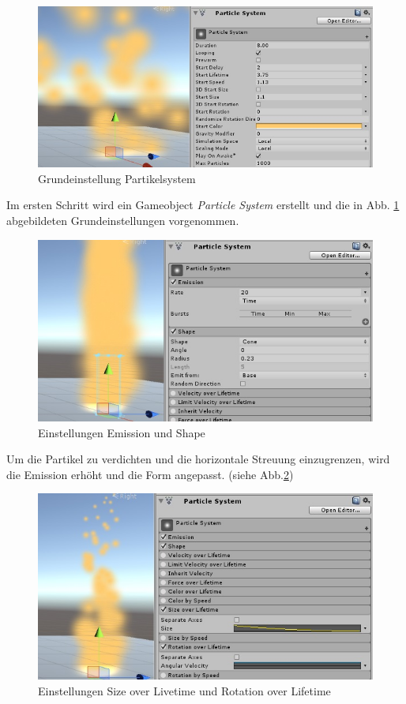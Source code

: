 \begin{figure}[H]
\centering
\includegraphics[width=0.95\linewidth]{Abbildungen/Unity/Fire/fire1}
\caption{Grundeinstellung Partikelsystem}
\label{fig:fire1}
\end{figure}

Im ersten Schritt wird ein Gameobject \textit{Particle System} erstellt und die in Abb. \ref{fig:fire1} abgebildeten Grundeinstellungen vorgenommen.

\begin{figure}[h!]
\centering
\includegraphics[width=0.95\linewidth]{Abbildungen/Unity/Fire/fire2}
\caption{Einstellungen Emission und Shape}
\label{fig:fire2}
\end{figure}

Um die Partikel zu verdichten und die horizontale Streuung einzugrenzen, wird die Emission erhöht und die Form angepasst. (siehe Abb.\ref{fig:fire2}) 

\begin{figure}[h!]
\centering
\includegraphics[width=0.95\linewidth]{Abbildungen/Unity/Fire/fire3}
\caption{Einstellungen Size over Livetime und Rotation over Lifetime}
\label{fig:fire3}
\end{figure}

